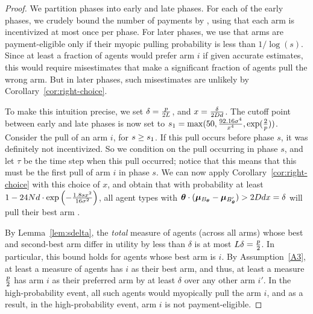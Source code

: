 \begin{proof}
We partition phases into early and late phases.
For each of the early phases,
we crudely bound the number of payments by \ARMNUM,
using that each arm is incentivized at most once per phase.
For later phases,
we use that arms are payment-eligible only if their myopic pulling
probability is less than $1/\log(s)$.
Since at least a \MinProb fraction of agents would prefer arm $i$ if
given accurate estimates, this would require misestimates that make a
significant fraction of agents pull the wrong arm.
But in later phases, such misestimates are unlikely by
Corollary~\ref{cor:right-choice}.

To make this intuition precise, we set
$\delta = \frac{p}{2 L}$,
and $x = \frac{\delta}{2 D d}$.
The cutoff point between early and late phases is now set to
$s_1 = \max(50, \frac{92.16 \sigma^4}{x^4}, \exp(\frac{2}{p}))$.
Consider the  pull of an arm $i$, for $s \geq s_1$.
If this pull occurs before phase $s$, it was definitely not incentivized.
So we condition on the pull occurring in phase $s$,
and let $\tau$ be the time step when this pull occurred; notice that
this means that this must be the first pull of arm $i$ in phase $s$.
We can now apply Corollary~\ref{cor:right-choice}
with this choice of $x$,
and obtain that with probability at least 
$1 - 24 N d \cdot \exp\left(-\frac{1.8 s x^2}{16 \sigma^2} \right)$,
all agent types \AgV with
$\bm{\theta} \cdot (\bm{\mu}_{B_{\bm{\theta}}} - \bm{\mu}_{B'_{\bm{\theta}}})
> 2D d x = \delta$
will pull their best arm \Best{\AgV}.

By Lemma~\ref{lem:sdelta}, the \emph{total} measure of agents (across
all arms) whose best and second-best arm differ in utility by less
than $\delta$ is at most $L \delta = \frac{p}{2}$.
In particular, this bound holds for agents whose best arm is $i$.
By Assumption~\ref{A3}, at least a measure \MinProb of agents has $i$
as their best arm, and thus, at least a measure $\frac{p}{2}$
has arm $i$ as their preferred arm by at least $\delta$ over any other
arm $i'$.
In the high-probability event, all such agents would myopically pull
the arm $i$, and as a result, in the high-probability event,
arm $i$ is not payment-eligible.


\end{proof}
